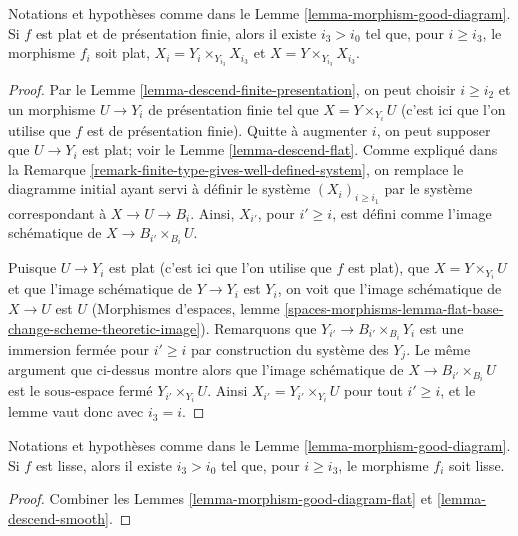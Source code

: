 \begin{lemma}
\label{lemma-morphism-good-diagram-flat}
Notations et hypoth\`eses comme dans le Lemme \ref{lemma-morphism-good-diagram}.
Si $f$ est plat et de pr\'esentation finie, alors
il existe $i_3 > i_0$ tel que, pour $i \geq i_3$, le morphisme
$f_i$ soit plat, $X_i = Y_i \times_{Y_{i_3}} X_{i_3}$ et
$X = Y \times_{Y_{i_3}} X_{i_3}$.
\end{lemma}

\begin{proof}
Par le Lemme \ref{lemma-descend-finite-presentation},
on peut choisir $i \geq i_2$ et un morphisme
$U \to Y_i$ de pr\'esentation finie tel que $X = Y \times_{Y_i} U$
(c'est ici que l'on utilise que $f$ est de pr\'esentation finie).
Quitte \`a augmenter $i$, on peut supposer que $U \to Y_i$ est plat; voir le
Lemme \ref{lemma-descend-flat}.
Comme expliqu\'e dans la Remarque \ref{remark-finite-type-gives-well-defined-system},
on remplace le diagramme initial ayant servi \`a d\'efinir le syst\`eme
$(X_i)_{i \geq i_1}$ par le syst\`eme correspondant \`a
$X \to U \to B_i$. Ainsi, $X_{i'}$, pour $i' \geq i$, est d\'efini comme
l'image sch\'ematique de $X \to B_{i'} \times_{B_i} U$.

\medskip\noindent
Puisque $U \to Y_i$ est plat (c'est ici que l'on utilise que $f$ est plat),
que $X = Y \times_{Y_i} U$ et
que l'image sch\'ematique de $Y \to Y_i$ est $Y_i$,
on voit que l'image sch\'ematique de $X \to U$ est $U$
(Morphismes d'espaces, lemme
\ref{spaces-morphisms-lemma-flat-base-change-scheme-theoretic-image}).
Remarquons que $Y_{i'} \to B_{i'} \times_{B_i} Y_i$ est une
immersion ferm\'ee pour $i' \geq i$ par construction du syst\`eme des $Y_j$.
Le m\^eme argument que ci-dessus montre alors que l'image sch\'ematique
de $X \to B_{i'} \times_{B_i} U$
est le sous-espace ferm\'e $Y_{i'} \times_{Y_i} U$.
Ainsi $X_{i'} = Y_{i'} \times_{Y_i} U$ pour tout $i' \geq i$,
et le lemme vaut donc avec $i_3 = i$.
\end{proof}

\begin{lemma}
\label{lemma-morphism-good-diagram-smooth}
Notations et hypoth\`eses comme dans le Lemme \ref{lemma-morphism-good-diagram}.
Si $f$ est lisse, alors il existe $i_3 > i_0$ tel que, pour
$i \geq i_3$, le morphisme $f_i$ soit lisse.
\end{lemma}

\begin{proof}
Combiner les Lemmes \ref{lemma-morphism-good-diagram-flat} et
\ref{lemma-descend-smooth}.
\end{proof}

